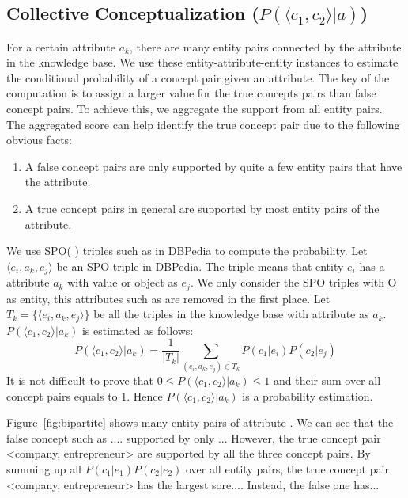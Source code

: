 \subsection{Collective Conceptualization ($P( \langle c_{1},c_{2} \rangle |a)$) }
For a certain attribute $a_k$, there are many entity pairs connected by the attribute in the knowledge base.
We use these entity-attribute-entity instances to estimate the conditional probability of a concept pair given an attribute. The key of the computation is to assign a larger value for the true concepts pairs than false concept pairs.
To achieve this, we aggregate the support from all entity pairs.
The aggregated score can help identify the true concept pair due to the following 
obvious facts:
\begin{enumerate}
\item A false concept pairs are only supported by quite a few
entity pairs that have the attribute.
\item A true concept pairs in general are supported by most entity pairs of the attribute.
\end{enumerate}




We use SPO( ) triples such as   in DBPedia
to compute the probability.
Let $ \langle e_i, a_k, e_j \rangle $ be an SPO triple in DBPedia.
The triple means that entity $e_i$ has a attribute $a_k$ with value or object as $e_j$.
We only consider the SPO triples with O as entity, this attributes such as  are removed in the first place. Let $T_k=\{\langle e_i, a_k, e_j \rangle\}$ be all the triples in the knowledge base with attribute as $a_k$.
$P( \langle c_1, c_2 \rangle |a_k)$ is estimated as follows:
\begin{equation}
P(\langle c_1, c_2\rangle|a_k)= \frac{1}{|T_k|}\sum_{  (e_{i},a_k,e_{j})\in T_k } P(c_1|e_{i})P(c_2|e_{j})
\label{eq:pccga}
\end{equation}
It is not difficult to prove that $0\leq P( \langle c_1, c_2 \rangle |a_k)\leq 1$ and their sum over all concept pairs equals to 1.
Hence $P( \langle c_1, c_2 \rangle |a_k)$ is a probability estimation.

\begin{example}
\label{exa:pggga}
Figure~\ref{fig:bipartite} shows many entity pairs of attribute . We can see that
the false concept such as .... supported by only ... However, the true concept pair \ac{<company, entrepreneur>}
are supported by all the three concept pairs. By summing up all $P(c_1|e_1)P(c_2|e_2) $ over all entity pairs, the true concept pair \ac{<company, entrepreneur>} has the largest sore.... Instead, the false one has...
\end{example}


